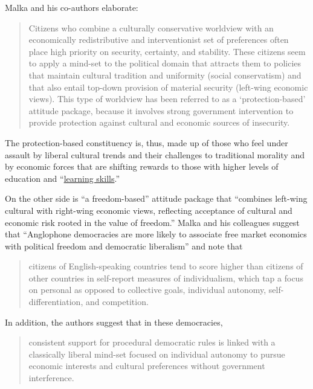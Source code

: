 Malka and his co-authors elaborate:

\begin{quote}
Citizens who combine a culturally conservative worldview with an
economically redistributive and interventionist set of preferences often
place high priority on security, certainty, and stability. These
citizens seem to apply a mind-set to the political domain that attracts
them to policies that maintain cultural tradition and uniformity (social
conservatism) and that also entail top-down provision of material
security (left-wing economic views). This type of worldview has been
referred to as a `protection-based' attitude package, because it
involves strong government intervention to provide protection against
cultural and economic sources of insecurity.
\end{quote}

The protection-based constituency is, thus, made up of those who feel
under assault by liberal cultural trends and their challenges to
traditional morality and by economic forces that are shifting rewards to
those with higher levels of education and
``\href{http://www.act.org/content/act/en/research/reports/act-publications/beyond-academics/core-academic-skills/core-academic-skills-framework.html}{learning
skills}.''

On the other side is ``a freedom-based'' attitude package that
``combines left-wing cultural with right-wing economic views, reflecting
acceptance of cultural and economic risk rooted in the value of
freedom.'' Malka and his colleagues suggest that ``Anglophone
democracies are more likely to associate free market economics with
political freedom and democratic liberalism'' and note that

\begin{quote}
citizens of English-speaking countries tend to score higher than
citizens of other countries in self-report measures of individualism,
which tap a focus on personal as opposed to collective goals, individual
autonomy, self-differentiation, and competition.
\end{quote}

In addition, the authors suggest that in these democracies,

\begin{quote}
consistent support for procedural democratic rules is linked with a
classically liberal mind-set focused on individual autonomy to pursue
economic interests and cultural preferences without government
interference.
\end{quote}

